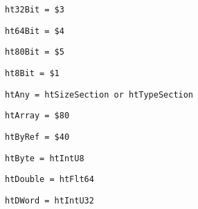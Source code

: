 \begin{verbatim}
ht32Bit = $3
\end{verbatim}
\label{thoriumcore:thorium:ht32bit}



\begin{verbatim}
ht64Bit = $4
\end{verbatim}
\label{thoriumcore:thorium:ht64bit}



\begin{verbatim}
ht80Bit = $5
\end{verbatim}
\label{thoriumcore:thorium:ht80bit}



\begin{verbatim}
ht8Bit = $1
\end{verbatim}
\label{thoriumcore:thorium:ht8bit}



\begin{verbatim}
htAny = htSizeSection or htTypeSection
\end{verbatim}
\label{thoriumcore:thorium:htany}



\begin{verbatim}
htArray = $80
\end{verbatim}
\label{thoriumcore:thorium:htarray}



\begin{verbatim}
htByRef = $40
\end{verbatim}
\label{thoriumcore:thorium:htbyref}



\begin{verbatim}
htByte = htIntU8
\end{verbatim}
\label{thoriumcore:thorium:htbyte}



\begin{verbatim}
htDouble = htFlt64
\end{verbatim}
\label{thoriumcore:thorium:htdouble}



\begin{verbatim}
htDWord = htIntU32
\end{verbatim}
\label{thoriumcore:thorium:htdword}



